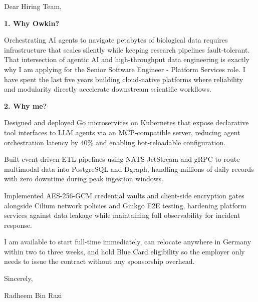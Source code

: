 \documentclass[11pt,a4paper]{coverletter}
\begin{document}

\opening{Dear Hiring Team,}

\vspace{8pt}\noindent\textbf{1. Why Owkin?}\par\vspace{3pt}

Orchestrating AI agents to navigate petabytes of biological data requires infrastructure that scales silently while keeping research pipelines fault-tolerant. That intersection of agentic AI and high-throughput data engineering is exactly why I am applying for the Senior Software Engineer - Platform Services role. I have spent the last five years building cloud-native platforms where reliability and modularity directly accelerate downstream scientific workflows.

\vspace{8pt}\noindent\textbf{2. Why me?}\par\vspace{3pt}

\bullets

  \item Designed and deployed Go microservices on Kubernetes that expose declarative tool interfaces to LLM agents via an MCP-compatible server, reducing agent orchestration latency by 40\% and enabling hot-reloadable configuration.

  \item Built event-driven ETL pipelines using NATS JetStream and gRPC to route multimodal data into PostgreSQL and Dgraph, handling millions of daily records with zero downtime during peak ingestion windows.

  \item Implemented AES-256-GCM credential vaults and client-side encryption gates alongside Cilium network policies and Ginkgo E2E testing, hardening platform services against data leakage while maintaining full observability for incident response.

\bulletsend

I am available to start full-time immediately, can relocate anywhere in Germany within two to three weeks, and hold Blue Card eligibility so the employer only needs to issue the contract without any sponsorship overhead.

\closing{Sincerely,}{Radheem Bin Razi}

\clearpage
{}

\end{document}
